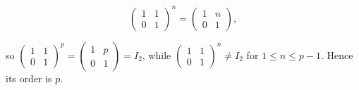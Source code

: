 \[\begin{pmatrix}
1 & 1 \\
0 & 1
\end{pmatrix}^{n} = \begin{pmatrix}
1 & n \\
0 & 1
\end{pmatrix},\]

so \(\begin{pmatrix}
1 & 1 \\
0 & 1
\end{pmatrix}^{p} = \begin{pmatrix}
1 & p \\
0 & 1
\end{pmatrix} = I_{2}\), while \(\begin{pmatrix}
1 & 1 \\
0 & 1
\end{pmatrix}^{n} \neq I_{2}\) for \(1 \leq n \leq p - 1\). Hence its order is \(p\).
